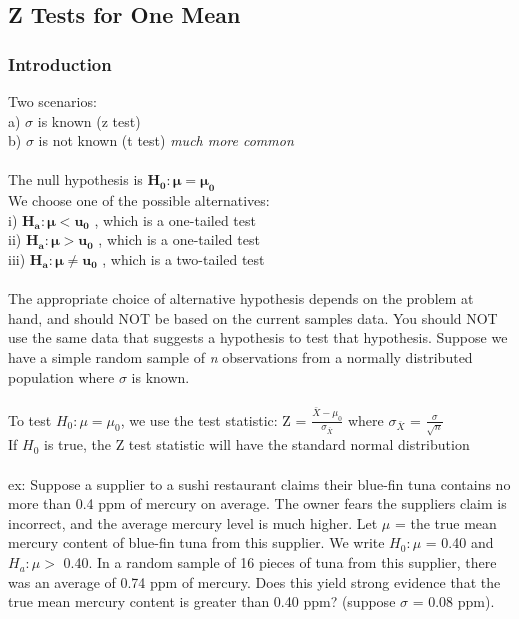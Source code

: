 \documentclass[12pt, a4paper]{article}
\begin{document}
	\subsection{Z Tests for One Mean}
		\subsubsection{Introduction}
		Two scenarios: \\
		a) $\sigma$ is known (z test) \\
		b) $\sigma$ is not known (t test) \textit{much more common} \\~\\
		The null hypothesis is $\bm{H_0: \mu = \mu_0}$ \\
		We choose one of the possible alternatives: \\
		i) $\bm{H_a: \mu < u_0}$ , which is a one-tailed test\\
		ii) $\bm{H_a: \mu > u_0}$ , which is a one-tailed test\\
		iii) $\bm{H_a: \mu \neq u_0}$ , which is a two-tailed test\\~\\
		The appropriate choice of alternative hypothesis depends on the problem at hand, and should NOT be based on the current samples data. You should NOT use the same data that suggests a hypothesis to test that hypothesis. \newpage
		\noindent Suppose we have a simple random sample of \textit{n} observations from a normally distributed population where $\sigma$ is known. \\~\\
		To test $H_0: \mu = \mu_0$, we use the test statistic: Z = $\frac{\bar{X} - \mu_0}{\sigma_{\bar{X}}}$ where $\sigma_{\bar{X}}$ = $\frac{\sigma}{\sqrt{n}}$ \\ If $H_0$ is true, the Z test statistic will have the standard normal distribution \\~\\
		ex: Suppose a supplier to a sushi restaurant claims their blue-fin tuna contains no more than 0.4 ppm of mercury on average. The owner fears the suppliers claim is incorrect, and the average mercury level is much higher. Let $\mu$ = the true mean mercury content of blue-fin tuna from this supplier. We write $H_0 : \mu$ = 0.40 and $H_a : \mu >$ 0.40. In a random sample of 16 pieces of tuna from this supplier, there was an average of 0.74 ppm of mercury. Does this yield strong evidence that the true mean mercury content is greater than 0.40 ppm? (suppose $\sigma$ = 0.08 ppm). \\
\end{document}
